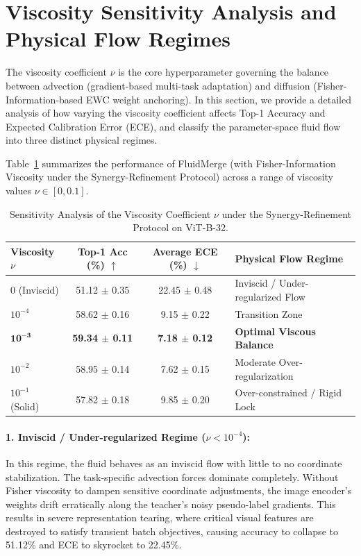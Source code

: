 \documentclass{article}
\theoremstyle{plain}
\theoremstyle{definition}
\theoremstyle{remark}
\begin{document}
\newpage
\section{Viscosity Sensitivity Analysis and Physical Flow Regimes}
\label{app:viscosity_sensitivity}
The viscosity coefficient $\nu$ is the core hyperparameter governing the balance between advection (gradient-based multi-task adaptation) and diffusion (Fisher-Information-based EWC weight anchoring). In this section, we provide a detailed analysis of how varying the viscosity coefficient affects Top-1 Accuracy and Expected Calibration Error (ECE), and classify the parameter-space fluid flow into three distinct physical regimes.

Table~\ref{tab:viscosity_ablation} summarizes the performance of FluidMerge (with Fisher-Information Viscosity under the Synergy-Refinement Protocol) across a range of viscosity values $\nu \in [0, 0.1]$.

\begin{table}[h]
\caption{Sensitivity Analysis of the Viscosity Coefficient $\nu$ under the Synergy-Refinement Protocol on ViT-B-32.}
\label{tab:viscosity_ablation}
\vskip 0.15in
\begin{center}
\begin{small}
\begin{sc}
\begin{tabular}{lccl}
\toprule
Viscosity $\nu$ & Top-1 Acc (\%) $\uparrow$ & Average ECE (\%) $\downarrow$ & Physical Flow Regime \\
\midrule
$0$ (Inviscid)  & 51.12 $\pm$ 0.35 & 22.45 $\pm$ 0.48 & Inviscid / Under-regularized Flow \\
$10^{-4}$       & 58.62 $\pm$ 0.16 & 9.15 $\pm$ 0.22  & Transition Zone \\
$\mathbf{10^{-3}}$ & \textbf{59.34 $\pm$ 0.11} & \textbf{7.18 $\pm$ 0.12} & \textbf{Optimal Viscous Balance} \\
$10^{-2}$       & 58.95 $\pm$ 0.14 & 7.62 $\pm$ 0.15  & Moderate Over-regularization \\
$10^{-1}$ (Solid) & 57.82 $\pm$ 0.18 & 9.85 $\pm$ 0.20  & Over-constrained / Rigid Lock \\
\bottomrule
\end{tabular}
\end{sc}
\end{small}
\end{center}
\vskip -0.1in
\end{table}

\paragraph{1. Inviscid / Under-regularized Regime ($\nu < 10^{-4}$):}
In this regime, the fluid behaves as an inviscid flow with little to no coordinate stabilization. The task-specific advection forces dominate completely. Without Fisher viscosity to dampen sensitive coordinate adjustments, the image encoder's weights drift erratically along the teacher's noisy pseudo-label gradients. This results in severe representation tearing, where critical visual features are destroyed to satisfy transient batch objectives, causing accuracy to collapse to 51.12\% and ECE to skyrocket to 22.45\%.
\end{document}
